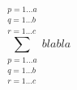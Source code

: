 \documentclass{article}
\begin{document}
    \[
        \displaystyle \sum _{\substack{p=1\dots a \\
                                       q=1\dots b \\
                                       r=1\dots c}}
                           ^{\substack{p=1\dots a \\
                                       q=1\dots b \\
                                       r=1\dots c}}
                           {blabla}
    \]
\end{document}

